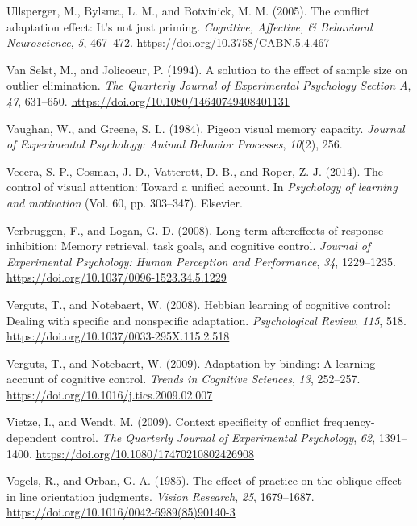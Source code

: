 \documentclass[]{DissertateCUNY}
\begin{document}
\leavevmode\hypertarget{ref-ullsperger_conflict_2005}{}%
Ullsperger, M., Bylsma, L. M., and Botvinick, M. M. (2005). The conflict
adaptation effect: It's not just priming. \emph{Cognitive, Affective, \&
Behavioral Neuroscience}, \emph{5}, 467--472.
\url{https://doi.org/10.3758/CABN.5.4.467}

\leavevmode\hypertarget{ref-van_selst_solution_1994}{}%
Van Selst, M., and Jolicoeur, P. (1994). A solution to the effect of
sample size on outlier elimination. \emph{The Quarterly Journal of
Experimental Psychology Section A}, \emph{47}, 631--650.
\url{https://doi.org/10.1080/14640749408401131}

\leavevmode\hypertarget{ref-vaughan_pigeon_1984}{}%
Vaughan, W., and Greene, S. L. (1984). Pigeon visual memory capacity.
\emph{Journal of Experimental Psychology: Animal Behavior Processes},
\emph{10}(2), 256.

\leavevmode\hypertarget{ref-vecera_control_2014}{}%
Vecera, S. P., Cosman, J. D., Vatterott, D. B., and Roper, Z. J. (2014).
The control of visual attention: Toward a unified account. In
\emph{Psychology of learning and motivation} (Vol. 60, pp. 303--347).
Elsevier.

\leavevmode\hypertarget{ref-verbruggen_long-term_2008}{}%
Verbruggen, F., and Logan, G. D. (2008). Long-term aftereffects of
response inhibition: Memory retrieval, task goals, and cognitive
control. \emph{Journal of Experimental Psychology: Human Perception and
Performance}, \emph{34}, 1229--1235.
\url{https://doi.org/10.1037/0096-1523.34.5.1229}

\leavevmode\hypertarget{ref-verguts_hebbian_2008}{}%
Verguts, T., and Notebaert, W. (2008). Hebbian learning of cognitive
control: Dealing with specific and nonspecific adaptation.
\emph{Psychological Review}, \emph{115}, 518.
\url{https://doi.org/10.1037/0033-295X.115.2.518}

\leavevmode\hypertarget{ref-verguts_adaptation_2009}{}%
Verguts, T., and Notebaert, W. (2009). Adaptation by binding: A learning
account of cognitive control. \emph{Trends in Cognitive Sciences},
\emph{13}, 252--257. \url{https://doi.org/10.1016/j.tics.2009.02.007}

\leavevmode\hypertarget{ref-vietze_context_2009}{}%
Vietze, I., and Wendt, M. (2009). Context specificity of conflict
frequency-dependent control. \emph{The Quarterly Journal of Experimental
Psychology}, \emph{62}, 1391--1400.
\url{https://doi.org/10.1080/17470210802426908}

\leavevmode\hypertarget{ref-vogels_effect_1985}{}%
Vogels, R., and Orban, G. A. (1985). The effect of practice on the
oblique effect in line orientation judgments. \emph{Vision Research},
\emph{25}, 1679--1687.
\url{https://doi.org/10.1016/0042-6989(85)90140-3}
\end{document}
